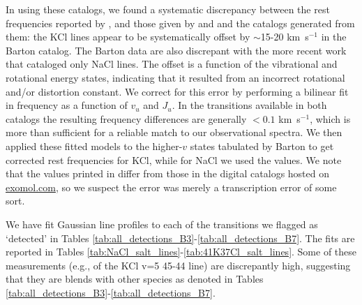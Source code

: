 \documentclass[12pt]{article}
\newcommand{\kms}{\textrm{km~s}\ensuremath{^{-1}}\xspace}	%
\begin{document}
In using these catalogs, we found a systematic discrepancy between the rest
frequencies reported by \cite{Barton2014a}, and those given by
\cite{Caris2004a} and \cite{Caris2002a} and the catalogs generated from them:
the KCl lines appear to be systematically offset by $\sim$15-20 \kms in the
Barton catalog.  The Barton data are also discrepant with the more recent
\cite{Cabezas2016a} work that cataloged only NaCl lines. The offset is a
function of the vibrational and rotational energy states, indicating that it
resulted from an incorrect rotational and/or distortion constant.  We correct
for this error by performing a bilinear fit in frequency as a function of $v_u$
and $J_u$.  In the transitions available in both catalogs the resulting
frequency differences are generally $<0.1$ \kms, which is more than sufficient
for a reliable match to our observational spectra.  We then applied these
fitted models to the higher-$v$ states tabulated by Barton to get corrected
rest frequencies for KCl, while for NaCl we used the \cite{Cabezas2016a}
values.  We note that the values printed in \cite{Barton2014a} differ from
those in the digital catalogs hosted on \url{exomol.com}, so we suspect the
error was merely a transcription error of some sort.







We have fit Gaussian line profiles to each of the transitions we flagged as
`detected' in Tables \ref{tab:all_detections_B3}-\ref{tab:all_detections_B7}.
The fits are reported in Tables
\ref{tab:NaCl_salt_lines}-\ref{tab:41K37Cl_salt_lines}.  Some of these
measurements (e.g., of the KCl v=5 45-44 line) are discrepantly
high, suggesting that they are blends with other species as denoted in 
Tables \ref{tab:all_detections_B3}-\ref{tab:all_detections_B7}.
\end{document}

